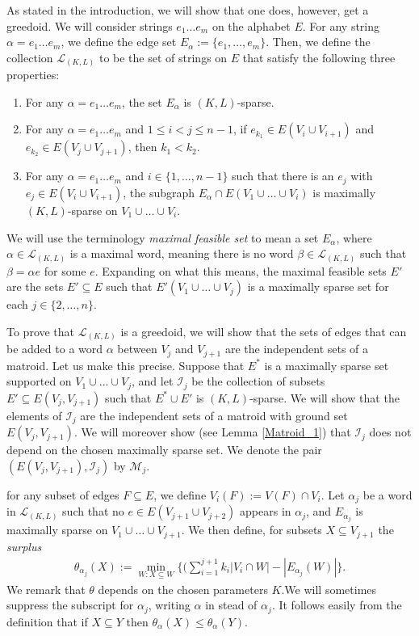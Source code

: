 \documentclass[10pt,a4paper]{article}
\begin{document}
As stated in the introduction, we will show that one does, however, get a greedoid. We will consider strings $e_1\dots e_m$ on the alphabet $E$. For any string $\alpha=e_1\dots e_m$, we define the edge set $E_\alpha:= \{e_1, \dots, e_m\}$. Then, we define the collection $\mathcal{L}_{(K,L)}$ to be the set of strings on $E$ that satisfy the following three properties:
\begin{enumerate}
\item{For any $\alpha=e_1\dots e_m$, the set $E_\alpha$ is $(K,L)$-sparse}.
\item{For any $\alpha=e_1\dots e_m$ and $1\leq i< j \leq n-1$, if $e_{k_1} \in E(V_i \cup V_{i+1})$ and $e_{k_2} \in  E(V_j \cup V_{j+1})$, then $k_1 < k_2$.}
\item{For any $\alpha=e_1\dots e_m$ and $i\in \{1,\dots, n-1\}$ such that there is an $e_j$ with $e_{j}\in E(V_i\cup V_{i+1})$, the subgraph $E_{\alpha} \cap E(V_1\cup \dots \cup V_i)$ is maximally $(K,L)$-sparse on $V_1\cup \dots \cup V_i$. }
\end{enumerate}

We will use the terminology \textit{maximal feasible set} to mean a set $E_{\alpha}$, where $\alpha \in \mathcal{L}_{(K,L)}$ is a maximal word, meaning there is no word $\beta \in \mathcal{L}_{(K,L)}$ such that $\beta = \alpha e$ for some $e$. Expanding on what this means, the maximal feasible sets $E'$ are the sets $E'\subseteq E$ such that $E'(V_1 \cup \dots \cup V_j)$ is a maximally sparse set for each $j\in \{2, \dots, n\}$.

To prove that $\mathcal{L}_{(K,L)}$ is a greedoid, we will show that the sets of edges that can be added to a word $\alpha$ between $V_j$ and $V_{j+1}$ are the independent sets of a matroid. Let us make this precise. Suppose that $E^*$ is a maximally sparse set supported on $V_1 \cup...\cup V_{j}$, and let $\mathcal{I}_j$ be the collection of subsets $E' \subseteq E(V_{j},V_{j+1})$ such that $E^* \cup E'$ is $(K,L)$-sparse. We will show that the elements of $\mathcal{I}_j$ are the independent sets of a matroid with ground set $E(V_{j},V_{j+1})$. We will moreover show (see Lemma \ref{Matroid_1}) that $\mathcal{I}_j$ does not depend on the chosen maximally sparse set. We denote the pair $(E(V_{j},V_{j+1}), \mathcal{I}_j)$ by $\mathcal{M}_j.$

for any subset of edges $F\subseteq E$, we define $V_i(F):=V(F)\cap V_i$.
Let $\alpha_j$ be a word in $\mathcal{L}_{(K,L)}$ such that no $e\in E(V_{j+1} \cup V_{j+2})$ appears in $\alpha_j$, and $E_{\alpha_j}$ is maximally sparse on $V_1 \cup \dots \cup V_{j+1}$. We then define, for subsets $X\subseteq V_{j+1}$ the \textit{surplus}
\begin{align*}
    \theta_{\alpha_j}(X) := \min_{W: X\subseteq W}\{(\sum_{i=1}^{j+1} k_{i}|V_{i} \cap W| - |E_{\alpha_j}(W)|\}.
\end{align*} 
We remark that $\theta$ depends on the chosen parameters $K$.We will sometimes suppress the subscript for $\alpha_j$, writing $\alpha$ in stead of $\alpha_j.$ It follows easily from the definition that if $X\subseteq Y$ then $\theta_{\alpha}(X) \leq \theta_{\alpha}(Y)$. 
\end{document}
